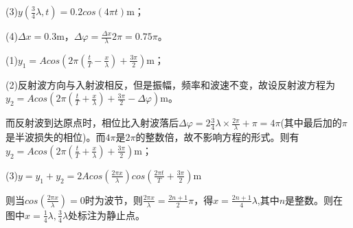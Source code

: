 (3)$y(\frac{3}{4}\lambda,t)=0.2cos(4\pi t)\mathrm{m}$；

(4)$\Delta x=0.3\mathrm{m}$，$\Delta \varphi=\frac{\Delta x}{\lambda}2\pi=0.75\pi$。

\exercise

\solve (1)$y_1=Acos(2\pi(\frac{t}{T}-\frac{x}{\lambda})+\frac{3\pi}{2})\mathrm{m}$；

(2)反射波方向与入射波相反，但是振幅，频率和波速不变，故设反射波方程为$y_2=Acos(2\pi(\frac{t}{T}+\frac{x}{\lambda})+\frac{3\pi}{2}-\Delta \varphi)\mathrm{m}$。

而反射波到达原点时，相位比入射波落后$\Delta \varphi =2 \frac{3}{4}\lambda\times \frac{2\pi}{\lambda}+\pi=4\pi$(其中最后加的$\pi$是半波损失的相位)。而$4\pi$是$2\pi$的整数倍，故不影响方程的形式。则有$y_2=Acos(2\pi(\frac{t}{T}+\frac{x}{\lambda})+\frac{3\pi}{2})\mathrm{m}$；

(3)$y=y_1+y_2=2Acos(\frac{2\pi x}{\lambda})cos(\frac{2\pi t}{T}+\frac{3\pi}{2})\mathrm{m}$

则当$cos(\frac{2\pi x}{\lambda})=0$时为波节，则$\frac{2\pi x}{\lambda}=\frac{2n+1}{2}\pi$，得$x=\frac{2n+1}{4}\lambda$,其中$n$是整数。则在图中$x=\frac{1}{4}\lambda,\frac{3}{4}\lambda$处标注为静止点。